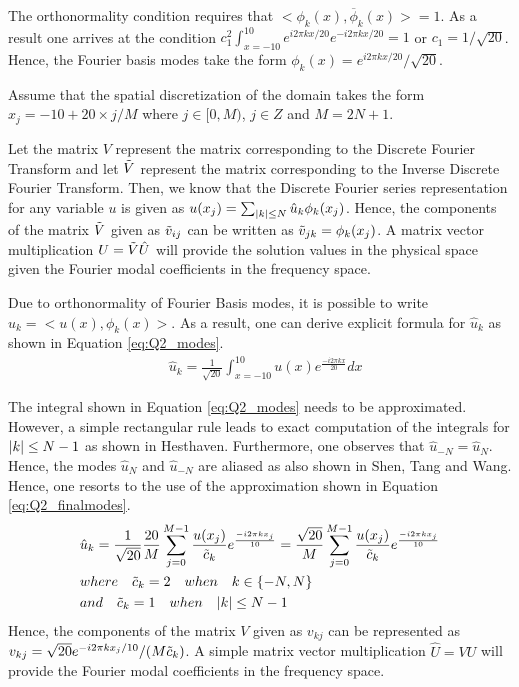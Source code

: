\documentclass[12pt,dvipsnames]{article}
\DeclarePairedDelimiter\abs{\lvert}{\rvert}
\begin{document}
The orthonormality condition requires that $<\phi_k(x), \overline{\phi}_k(x)> = 1$. As a result one arrives at the condition $c_1^2 \int_{x = -10}^{10} e^{i 2\pi k x /20} e^{-i 2\pi k x /20} = 1$ or $c_1 = 1/\sqrt{20}$. Hence, the Fourier basis modes take the form $\phi_k(x) = e^{i 2 \pi k x /20}/\sqrt{20}$.

Assume that the spatial discretization of the domain takes the form $x_j = -10 + 20 \times j/M$ where $j \in [0, M)$, $j \in Z$ and $M = 2N + 1$. 

Let the matrix $V$ represent the matrix corresponding to the Discrete Fourier Transform and let $\Tilde{V}$ represent the matrix corresponding to the Inverse Discrete Fourier Transform. Then, we know that the Discrete Fourier series representation for any variable $u$ is given as $u(x_j) = \sum_{\abs{k} \leq N} \hat{u}_k \phi_k(x_j)$. Hence, the components of the matrix $\Tilde{V}$ given as $\Tilde{v}_{ij}$ can be written as $\Tilde{v}_{jk} = \phi_k(x_j)$. A matrix vector multiplication $U = \Tilde{V} \hat{U}$ will provide the solution values in the physical space given the Fourier modal coefficients in the frequency space. 

Due to orthonormality of Fourier Basis modes, it is possible to write $\hat{u}_k = <u(x), \phi_k(x)>$. As a result, one can derive explicit formula for $\hat{u}_k$ as shown in Equation \ref{eq:Q2_modes}.
\begin{equation}
    \begin{aligned}
        & \hat{u}_k = \frac{1}{\sqrt{20}} \int_{x = -10}^{10} u(x) e^{\frac{-i 2 \pi k x}{20}} dx 
    \end{aligned}
\label{eq:Q2_modes}
\end{equation}

The integral shown in Equation \ref{eq:Q2_modes} needs to be approximated. However, a simple rectangular rule leads to exact computation of the integrals for $\abs{k} \leq N - 1$ as shown in Hesthaven. Furthermore, one observes that $\hat{u}_{-N} = \hat{u}_{N}$. Hence, the modes $\hat{u}_N$ and $\hat{u}_{-N}$ are aliased as also shown in Shen, Tang and Wang. Hence, one resorts to the use of the approximation shown in Equation \ref{eq:Q2_finalmodes}.
\begin{equation}
    \begin{aligned}
        & \hat{u}_k = \frac{1}{\sqrt{20}} \frac{20}{M} \sum_{j = 0}^{M - 1} \frac{u(x_j)}{\Tilde{c}_k} e^{\frac{-i 2 \pi k x_j}{10}} =   \frac{\sqrt{20}}{M} \sum_{j = 0}^{M - 1} \frac{u(x_j)}{\Tilde{c}_k} e^{\frac{-i 2 \pi k x_j}{10}} \\
        & where \quad \Tilde{c}_k = 2 \quad when \quad  k \in \{ -N, N \} \\
        & and \quad  \Tilde{c}_k = 1 \quad when \quad \abs{k} \leq N - 1
    \end{aligned}
    \label{eq:Q2_finalmodes}
\end{equation}
Hence, the components of the matrix $V$ given as $v_{kj}$ can be represented as $v_{kj} = \sqrt{20} e^{-i 2 \pi k x_j/10}/(M \Tilde{c}_k)$. A simple matrix vector multiplication $\hat{U} = VU$ will provide the Fourier modal coefficients in the frequency space.
\end{document}
